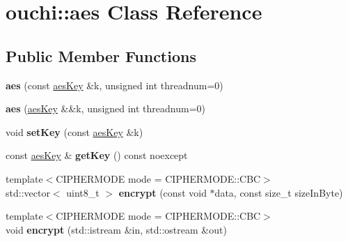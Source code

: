 \hypertarget{classouchi_1_1aes}{}\section{ouchi\+::aes Class Reference}
\label{classouchi_1_1aes}
\subsection*{Public Member Functions}
\begin{DoxyCompactItemize}
\item 
\mbox{\label{classouchi_1_1aes_aa07d91f2a113674e643d10cab3642aee}} 
{\bfseries aes} (const \mbox{\hyperlink{structouchi_1_1aes_key}{aes\+Key}} \&k, unsigned int threadnum=0)
\item 
\mbox{\label{classouchi_1_1aes_a8d896b0131a0361417986dbbc757dec6}} 
{\bfseries aes} (\mbox{\hyperlink{structouchi_1_1aes_key}{aes\+Key}} \&\&k, unsigned int threadnum=0)
\item 
\mbox{\label{classouchi_1_1aes_a3bb523f74a51f533347c0526a490c9a6}} 
void {\bfseries set\+Key} (const \mbox{\hyperlink{structouchi_1_1aes_key}{aes\+Key}} \&k)
\item 
\mbox{\label{classouchi_1_1aes_a52fbbe9df2f19829a1d43b457391ba0b}} 
const \mbox{\hyperlink{structouchi_1_1aes_key}{aes\+Key}} \& {\bfseries get\+Key} () const noexcept
\item 
\mbox{\label{classouchi_1_1aes_a23b429f52139708038fd62eb16a4174c}} 
{\footnotesize template$<$C\+I\+P\+H\+E\+R\+M\+O\+DE mode = C\+I\+P\+H\+E\+R\+M\+O\+D\+E\+::\+C\+BC$>$ }\\std\+::vector$<$ uint8\+\_\+t $>$ {\bfseries encrypt} (const void $\ast$data, const size\+\_\+t size\+In\+Byte)
\item 
\mbox{\label{classouchi_1_1aes_ae36943be68f68ebbf89607cb41809fd1}} 
{\footnotesize template$<$C\+I\+P\+H\+E\+R\+M\+O\+DE mode = C\+I\+P\+H\+E\+R\+M\+O\+D\+E\+::\+C\+BC$>$ }\\void {\bfseries encrypt} (std\+::istream \&in, std\+::ostream \&out)
\item 
\mbox{\label{classouchi_1_1aes_a618cc038001fd6d28fd919941aaa658b}} 

\end{DoxyCompactItemize}
